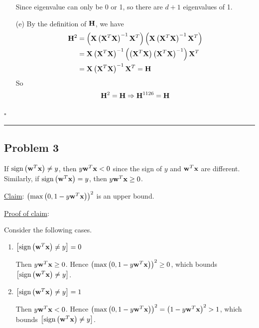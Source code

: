 \documentclass[12pt]{article}
\newcommand*{\QEDB}{\hfill\ensuremath{\square}}
\newcommand{\SBrackets}[1]{\left[#1\right]}
\newcommand{\ParTh}[1]{\left(#1\right)}
\newcommand{\BF}[1]{{\bf#1}}
\newcommand{\horrule}[1]{\rule{\linewidth}{#1}}
\begin{document}
\begin{enumerate}
	Since eigenvalue can only be 0 or 1, so there are $d+1$ eigenvalues of 1.

	\item[(e)] By the definition of $\BF{H}$, we have
	\begin{align}
	\BF{H}^2&=\ParTh{\BF{X}\ParTh{\BF{X}^T\BF{X}}^{-1}\BF{X}^T}\ParTh{\BF{X}\ParTh{\BF{X}^T\BF{X}}^{-1}\BF{X}^T}\\
	&=\BF{X}\ParTh{\BF{X}^T\BF{X}}^{-1}\ParTh{\ParTh{\BF{X}^T\BF{X}}\ParTh{\BF{X}^T\BF{X}}^{-1}}\BF{X}^T\\
	&=\BF{X}\ParTh{\BF{X}^T\BF{X}}^{-1}\BF{X}^T=\BF{H}
	\end{align}
	So
	\begin{align}
	\BF{H}^2=\BF{H}\Rightarrow \BF{H}^{1126}=\BF{H}
	\end{align}
\end{enumerate}

\QEDB

\horrule{0.5pt}

\subsection*{Problem 3}

If $\text{sign}\ParTh{\BF{w}^T\BF{x}}\neq y$, then $y\BF{w}^T\BF{x}<0$ since the sign of $y$ and $\BF{w}^T\BF{x}$ are different. Similarly, if $\text{sign}\ParTh{\BF{w}^T\BF{x}}=y$, then $y\BF{w}^T\BF{x}\geq0$.

\underline{Claim}: $\ParTh{\max\ParTh{0,1-y\BF{w}^T\BF{x}}}^2$ is an upper bound.

\underline{Proof of claim}:

Consider the following cases.
\begin{enumerate}
	\item $\SBrackets{\text{sign}\ParTh{\BF{w}^T\BF{x}}\neq y}=0$
	
	Then $y\BF{w}^T\BF{x}\geq0$. Hence $\ParTh{\max\ParTh{0,1-y\BF{w}^T\BF{x}}}^2\geq0$, which bounds $\SBrackets{\text{sign}\ParTh{\BF{w}^T\BF{x}}\neq y}$.
	\item $\SBrackets{\text{sign}\ParTh{\BF{w}^T\BF{x}}\neq y}=1$
	
	Then $y\BF{w}^T\BF{x}<0$. Hence $\ParTh{\max\ParTh{0,1-y\BF{w}^T\BF{x}}}^2=\ParTh{1-y\BF{w}^T\BF{x}}^2>1$, which bounds $\SBrackets{\text{sign}\ParTh{\BF{w}^T\BF{x}}\neq y}$.
\end{enumerate}
\end{document}
